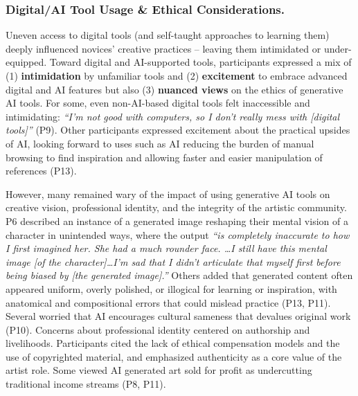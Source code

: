 \subsubsection{Digital/AI Tool Usage \& Ethical Considerations.}
Uneven access to digital tools (and self-taught approaches to learning them) deeply influenced novices' creative practices -- leaving them intimidated or under-equipped. 
Toward digital and AI-supported tools, participants expressed a mix of (1) \textbf{intimidation} by unfamiliar tools and (2) \textbf{excitement} to embrace advanced digital and AI features but also (3) \textbf{nuanced views} on the ethics of generative AI tools.  
For some, even non-AI-based digital tools felt inaccessible and intimidating: \textit{``I'm not good with computers, so I don't really mess with [digital tools]''} (P9). Other participants expressed excitement about the practical upsides of AI, looking forward to uses such as AI reducing the burden of manual browsing to find inspiration and allowing faster and easier manipulation of references (P13). 


However, many remained wary of the impact of using generative AI tools on creative vision, professional identity, and the integrity of the artistic community. 
P6 described an instance of a generated image reshaping their mental vision of a character in unintended ways, where the output \textit{``is completely inaccurate to how I first imagined her. She had a much rounder face. \dots I still have this mental image [of the character]\dots I'm sad that I didn't articulate that myself first before being biased by [the generated image].''} Others added that generated content often appeared uniform, overly polished, or illogical for learning or inspiration, with anatomical and compositional errors that could mislead practice (P13, P11). Several worried that AI encourages cultural sameness that devalues original work (P10). Concerns about professional identity centered on authorship and livelihoods. Participants cited the lack of ethical compensation models and the use of copyrighted material, and emphasized authenticity as a core value of the artist role. Some viewed AI generated art sold for profit as undercutting traditional income streams (P8, P11). 

